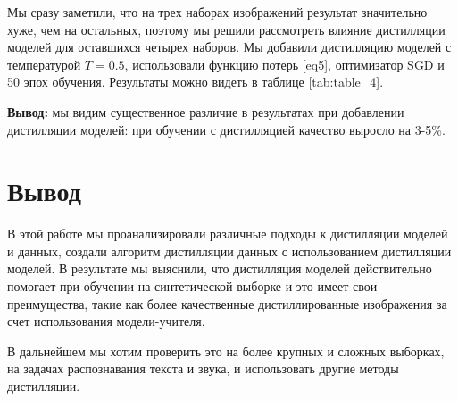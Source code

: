 \documentclass[12pt]{article}
\begin{document}
Мы сразу заметили, что на трех наборах изображений результат значительно хуже, чем на остальных, поэтому мы решили рассмотреть влияние дистилляции моделей для оставшихся четырех наборов. Мы добавили дистилляцию моделей с температурой $T = 0.5$, использовали функцию потерь \ref{eq5}, оптимизатор SGD и 50 эпох обучения. Результаты можно видеть в таблице \ref{tab:table_4}. 



\textbf{Вывод:} мы видим существенное различие в результатах при добавлении дистилляции моделей: при обучении с дистилляцией качество выросло на 3-5\%. 





\section{Вывод}

В этой работе мы проанализировали различные подходы к дистилляции моделей и данных, создали алгоритм дистилляции данных с использованием дистилляции моделей. 
В результате мы выяснили, что дистилляция моделей действительно помогает при обучении на синтетической выборке и это имеет свои преимущества, такие как более качественные дистиллированные изображения за счет использования модели-учителя.

В дальнейшем мы хотим проверить это на более крупных и сложных выборках, на задачах распознавания текста и звука, и использовать другие методы дистилляции.
\end{document}
